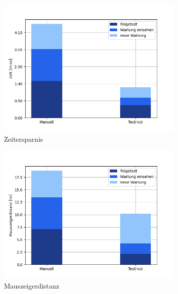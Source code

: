 \begin{figure}[H]
    \centering
    \begin{subfigure}{.5\textwidth}
      \centering
      \includegraphics[width=\linewidth]{speedtests/validierung_Zeit.png}
      \caption{Zeitersparnis}
    \end{subfigure}%
    \begin{subfigure}{.5\textwidth}
      \centering
      \includegraphics[width=\linewidth]{speedtests/validierung_cursordistanz.png}
      \caption{Mauszeigerdistanz}
    \end{subfigure}\\
    \begin{subfigure}{.5\textwidth}
        \centering

\end{subfigure}
\end{figure}
